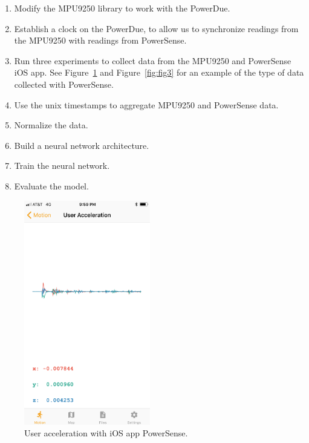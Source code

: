 \documentclass[journal]{IEEEtranTIE}
\begin{document}
\begin{enumerate}
\item Modify the MPU9250 library to work with the PowerDue.
\item Establish a clock on the PowerDue, to allow us to synchronize readings
      from the MPU9250 with readings from PowerSense.
\item Run three experiments to collect data from the MPU9250 and PowerSense iOS
      app. See Figure~\ref{fig:fig2} and Figure~\ref{fig:fig3} for an example of
      the type of data collected with PowerSense.
\item Use the unix timestamps to aggregate MPU9250 and PowerSense data.
\item Normalize the data.
\item Build a neural network architecture.
\item Train the neural network.
\item Evaluate the model.
\end{enumerate}

\begin{figure}[!t]\centering
	\includegraphics[width=5.5cm]{acceleration}
	\caption{User acceleration with iOS app PowerSense.}\label{fig:fig2}
\end{figure}
\end{document}
